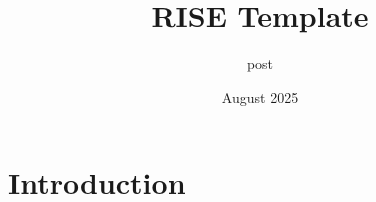 \documentclass{article}
\title{RISE Template}
\author{post }
\date{August 2025}
\begin{document}
\maketitle

\section{Introduction}
\end{document}
